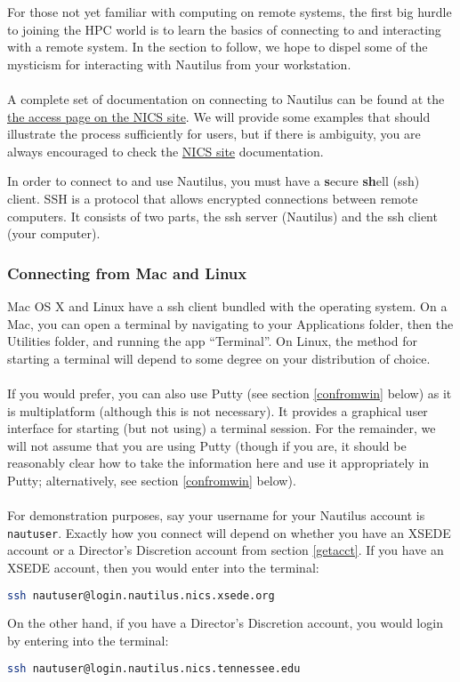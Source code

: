 
For those not yet familiar with computing on remote systems, the first big hurdle to joining the HPC world is to learn the basics of connecting to and interacting with a remote system.  In the section to follow, we hope to dispel some of the mysticism for interacting with Nautilus from your workstation.\\\\
%
A complete set of documentation on connecting to Nautilus can be found at the \href{http://www.nics.tennessee.edu/getting-started/access}{the access page on the NICS site}.  We will provide some examples that should illustrate the process sufficiently for users, but if there is ambiguity, you are always encouraged to check the \href{http://www.nics.tennessee.edu}{NICS site} documentation.

In order to connect to and use Nautilus, you must have a \textbf{s}ecure \textbf{sh}ell (ssh) client.  SSH is a protocol that allows encrypted connections between remote computers.  It consists of two parts, the ssh server (Nautilus) and the ssh client (your computer).

\subsubsection{Connecting from Mac and Linux}\label{confml}
Mac OS X and Linux have a ssh client bundled with the operating system.  On a Mac, you can open a terminal by navigating to your Applications folder, then the Utilities folder, and running the app ``Terminal''.  On Linux, the method for starting a terminal will depend to some degree on your distribution of choice.\\\\
%
If you would prefer, you can also use Putty (see section \ref{confromwin} below) as it is multiplatform (although this is not necessary).  It provides a graphical user interface for starting (but not using) a terminal session.  For the remainder, we will not assume that you are using Putty (though if you are, it should be reasonably clear how to take the information here and use it appropriately in Putty; alternatively, see section \ref{confromwin} below).\\\\
%
For demonstration purposes, say your username for your Nautilus account is \texttt{nautuser}.  Exactly how you connect will depend on whether you have an XSEDE account or a Director's Discretion account from section \ref{getacct}.  If you have an XSEDE account, then you would enter into the terminal:
\begin{lstlisting}[language=sh]
ssh nautuser@login.nautilus.nics.xsede.org
\end{lstlisting}%
On the other hand, if you have a Director's Discretion account, you would login by entering into the terminal:
\begin{lstlisting}[language=sh]
ssh nautuser@login.nautilus.nics.tennessee.edu
\end{lstlisting}%

